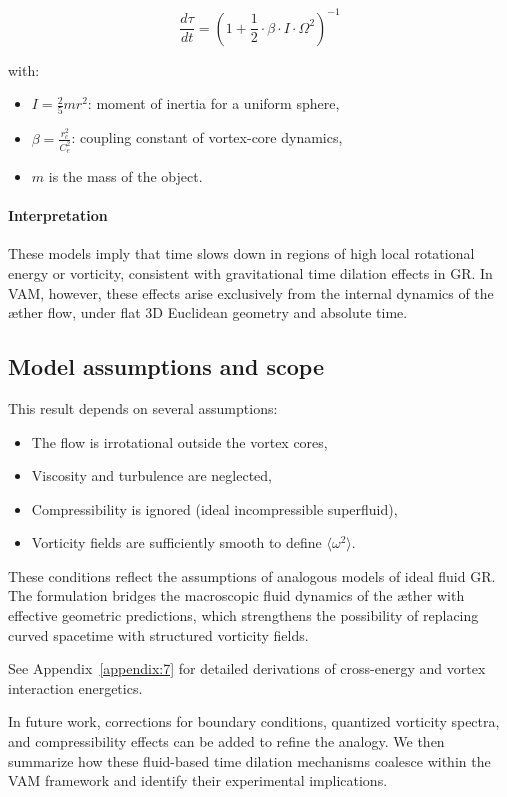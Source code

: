 \begin{equation}
    \frac{d\tau}{dt} =
    \left(1 + \frac{1}{2} \cdot \beta \cdot I \cdot \Omega^2 \right)^{-1}
\end{equation}

with:
\begin{itemize}
    \item \( I = \frac{2}{5} m r^2 \): moment of inertia for a uniform sphere,
    \item \( \beta = \frac{r_c^2}{C_e^2} \): coupling constant of vortex-core dynamics,
    \item \( m \) is the mass of the object. \end{itemize}

\paragraph{Interpretation}

These models imply that time slows down in regions of high local rotational energy or vorticity, consistent with gravitational time dilation effects in GR. In VAM, however, these effects arise exclusively from the internal dynamics of the æther flow, under flat 3D Euclidean geometry and absolute time.

\subsection{Model assumptions and scope}

This result depends on several assumptions:
\begin{itemize}
    \item The flow is irrotational outside the vortex cores,
    \item Viscosity and turbulence are neglected,
    \item Compressibility is ignored (ideal incompressible superfluid),
    \item Vorticity fields are sufficiently smooth to define $\langle \omega^2 \rangle$.
\end{itemize}

These conditions reflect the assumptions of analogous models of ideal fluid GR. The formulation bridges the macroscopic fluid dynamics of the æther with effective geometric predictions, which strengthens the possibility of replacing curved spacetime with structured vorticity fields.

See Appendix~\ref{appendix:7} for detailed derivations of cross-energy and vortex interaction energetics.

In future work, corrections for boundary conditions, quantized vorticity spectra, and compressibility effects can be added to refine the analogy. We then summarize how these fluid-based time dilation mechanisms coalesce within the VAM framework and identify their experimental implications.